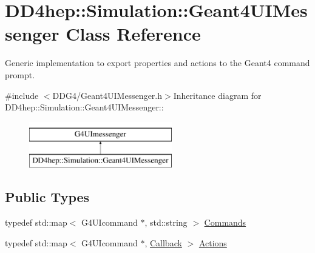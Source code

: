 \hypertarget{class_d_d4hep_1_1_simulation_1_1_geant4_u_i_messenger}{
\section{DD4hep::Simulation::Geant4UIMessenger Class Reference}
\label{class_d_d4hep_1_1_simulation_1_1_geant4_u_i_messenger}
}


Generic implementation to export properties and actions to the Geant4 command prompt.  


{\ttfamily \#include $<$DDG4/Geant4UIMessenger.h$>$}Inheritance diagram for DD4hep::Simulation::Geant4UIMessenger::\begin{figure}[H]
\begin{center}
\leavevmode
\includegraphics[height=2cm]{class_d_d4hep_1_1_simulation_1_1_geant4_u_i_messenger}
\end{center}
\end{figure}
\subsection*{Public Types}
\begin{DoxyCompactItemize}
\item 
typedef std::map$<$ G4UIcommand $\ast$, std::string $>$ \hyperlink{class_d_d4hep_1_1_simulation_1_1_geant4_u_i_messenger_a07e66059e5542ef6c393fda188f44907}{Commands}
\item 
typedef std::map$<$ G4UIcommand $\ast$, \hyperlink{class_d_d4hep_1_1_callback}{Callback} $>$ \hyperlink{class_d_d4hep_1_1_simulation_1_1_geant4_u_i_messenger_a91b01eab1bb56af8661d2c99660211cd}{Actions}
\end{DoxyCompactItemize}
